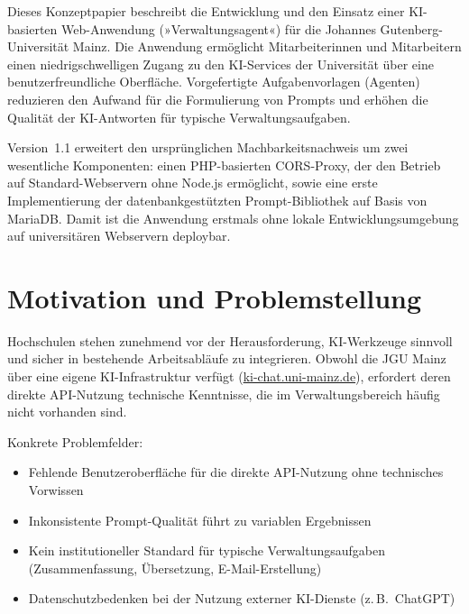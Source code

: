 \documentclass[12pt, a4paper]{article}
\begin{document}
Dieses Konzeptpapier beschreibt die Entwicklung und den Einsatz einer KI-basierten Web-Anwendung (»Verwaltungsagent«) für die Johannes Gutenberg-Universität Mainz. Die Anwendung ermöglicht Mitarbeiterinnen und Mitarbeitern einen niedrigschwelligen Zugang zu den KI-Services der Universität über eine benutzerfreundliche Oberfläche. Vorgefertigte Aufgabenvorlagen (Agenten) reduzieren den Aufwand für die Formulierung von Prompts und erhöhen die Qualität der KI-Antworten für typische Verwaltungsaufgaben.

Version~1.1 erweitert den ursprünglichen Machbarkeitsnachweis um zwei wesentliche Komponenten: einen PHP-basierten CORS-Proxy, der den Betrieb auf Standard-Webservern ohne Node.js ermöglicht, sowie eine erste Implementierung der datenbankgestützten Prompt-Bibliothek auf Basis von MariaDB. Damit ist die Anwendung erstmals ohne lokale Entwicklungsumgebung auf universitären Webservern deploybar.

\section{Motivation und Problemstellung}

Hochschulen stehen zunehmend vor der Herausforderung, KI-Werkzeuge sinnvoll und sicher in bestehende Arbeitsabläufe zu integrieren. Obwohl die JGU Mainz über eine eigene KI-Infrastruktur verfügt (\href{https://ki-chat.uni-mainz.de}{ki-chat.uni-mainz.de}), erfordert deren direkte API-Nutzung technische Kenntnisse, die im Verwaltungsbereich häufig nicht vorhanden sind.

Konkrete Problemfelder:
\begin{itemize}[leftmargin=1.5cm]
  \item Fehlende Benutzeroberfläche für die direkte API-Nutzung ohne technisches Vorwissen
  \item Inkonsistente Prompt-Qualität führt zu variablen Ergebnissen
  \item Kein institutioneller Standard für typische Verwaltungsaufgaben (Zusammenfassung, Übersetzung, E-Mail-Erstellung)
  \item Datenschutzbedenken bei der Nutzung externer KI-Dienste (z.\,B.\ ChatGPT)
\end{itemize}

\end{document}
